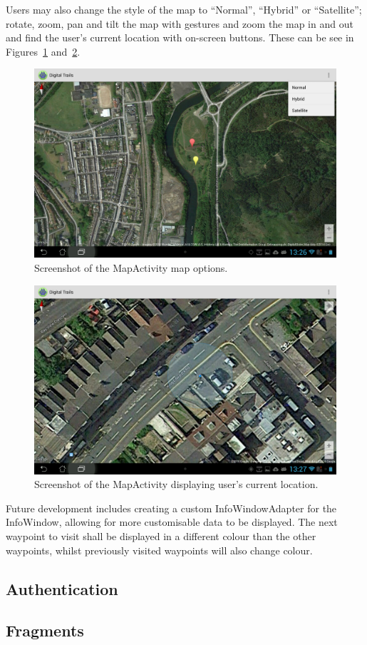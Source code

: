 \documentclass[11pt,a4paper]{article}
\begin{document}
Users may also change the style of the map to ``Normal'', ``Hybrid'' or ``Satellite''; rotate, zoom, pan and tilt the map with gestures and zoom the map in and out and find the user's current location with on-screen buttons. These can be see in Figures~\ref{fig:mapOptions} and~\ref{fig:userLocation}.

\begin{figure}[H]
\centering
\includegraphics[angle=90, width=.6\linewidth]{mapOptions.jpg}
\caption{Screenshot of the MapActivity map options.}
\label{fig:mapOptions}
\end{figure}

\begin{figure}[H]
\centering
\includegraphics[angle=90, width=.6\linewidth]{userLocation.jpg}
\caption{Screenshot of the MapActivity displaying user's current location.}
\label{fig:userLocation}
\end{figure}

Future development includes creating a custom InfoWindowAdapter for the InfoWindow, allowing for more customisable data to be displayed. The next waypoint to visit shall be displayed in a different colour than the other waypoints, whilst previously visited waypoints will also change colour. 


\subsection{Authentication}
\label{sec:authorisation}

\subsection{Fragments}
\label{sec:fragments}
\end{document}

